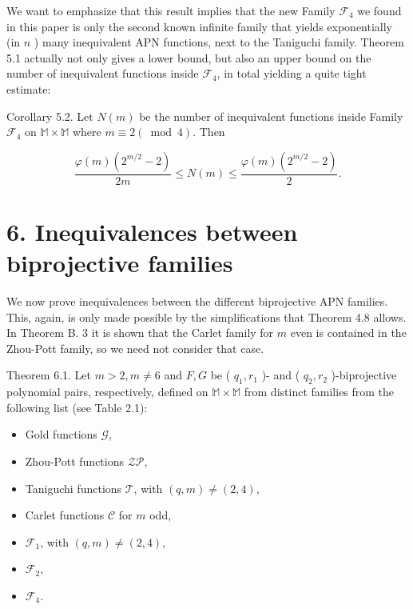 \documentclass[10pt]{article}
\begin{document}
We want to emphasize that this result implies that the new Family $\mathcal{F}_{4}$ we found in this paper is only the second known infinite family that yields exponentially (in $n$ ) many inequivalent APN functions, next to the Taniguchi family. Theorem 5.1 actually not only gives a lower bound, but also an upper bound on the number of inequivalent functions inside $\mathcal{F}_{4}$, in total yielding a quite tight estimate:

Corollary 5.2. Let $N(m)$ be the number of inequivalent functions inside Family $\mathcal{F}_{4}$ on $\mathbb{M} \times \mathbb{M}$ where $m \equiv 2(\bmod 4)$. Then

$$
\frac{\varphi(m)\left(2^{m / 2}-2\right)}{2 m} \leqslant N(m) \leqslant \frac{\varphi(m)\left(2^{m / 2}-2\right)}{2} .
$$

\section*{6. Inequivalences between biprojective families}
We now prove inequivalences between the different biprojective APN families. This, again, is only made possible by the simplifications that Theorem 4.8 allows. In Theorem B. 3 it is shown that the Carlet family for $m$ even is contained in the Zhou-Pott family, so we need not consider that case.

Theorem 6.1. Let $m>2, m \neq 6$ and $F, G$ be ( $q_{1}, r_{1}$ )- and ( $q_{2}, r_{2}$ )-biprojective polynomial pairs, respectively, defined on $\mathbb{M} \times \mathbb{M}$ from distinct families from the following list (see Table 2.1):

\begin{itemize}
  \item Gold functions $\mathcal{G}$,
  \item Zhou-Pott functions $\mathcal{Z P}$,
  \item Taniguchi functions $\mathcal{T}$, with $(q, m) \neq(2,4)$,
  \item Carlet functions $\mathcal{C}$ for $m$ odd,
  \item $\mathcal{F}_{1}$, with $(q, m) \neq(2,4)$,
  \item $\mathcal{F}_{2}$,
  \item $\mathcal{F}_{4}$.
\end{itemize}
\end{document}
